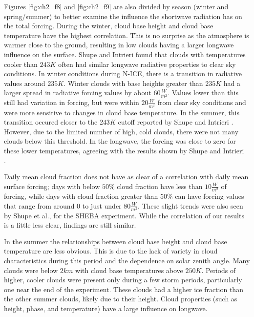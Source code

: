 Figures \ref{fig:ch2_f8} and \ref{fig:ch2_f9} are also divided by season (winter and spring/summer) to better examine the influence the shortwave radiation has on the total forcing. During the winter, cloud base height and cloud base temperature have the highest correlation. This is no surprise as the atmosphere is warmer close to the ground, resulting in low clouds having a larger longwave influence on the surface. Shupe and Intrieri \cite{shupe:2004} found that clouds with temperatures cooler than $243 K$ often had similar longwave radiative properties to clear sky conditions. In winter conditions during N-ICE, there is a transition in radiative values around $235 K$. Winter clouds with base heights greater than $235 K$ had a larger spread in radiative forcing values by about $60 \frac{W}{m^{2}}$. Values lower than this still had variation in forcing, but were within $20 \frac{W}{m^{2}}$ from clear sky conditions and were more sensitive to changes in cloud base temperature. In the summer, this transition occured closer to the $243 K$ cutoff reported by Shupe and Intrieri \cite{shupe:2004}. However, due to the limited number of high, cold clouds, there were not many clouds below this threshold. In the longwave, the forcing was close to zero for these lower temperatures, agreeing with the results shown by Shupe and Intrieri \cite{shupe:2004}. 

Daily mean cloud fraction does not have as clear of a correlation with daily mean surface forcing; days with below $50 \%$ cloud fraction have less than $10 \frac{W}{m^{2}}$ of forcing, while days with cloud fraction greater than $50 \%$ can have forcing values that range from around 0 to just under $80 \frac{W}{m^{2}}$. These slight trends were also seen by Shupe et al., \cite{shupe:2004} for the SHEBA experiment. While the correlation of our results is a little less clear, findings are still similar. 

In the summer the relationships between cloud base height and cloud base temperature are less obvious. This is due to the lack of variety in cloud characteristics during this period and the dependence on solar zenith angle. Many clouds were below $2 km$ with cloud base temperatures above $250 K$. Periods of higher, cooler clouds were present only during a few storm periods, particularly one near the end of the experiment. These clouds had a higher ice fraction than the other summer clouds, likely due to their height. Cloud properties (such as height, phase, and temperature) have a large influence on longwave.

